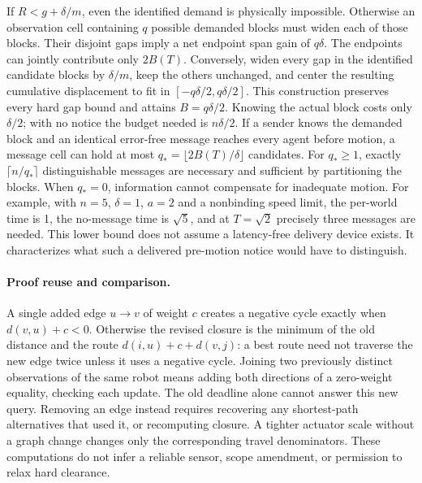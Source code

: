 \documentclass[11pt]{article}
\begin{document}
If \(R<g+\delta/m\), even the identified demand is physically
impossible. Otherwise an observation cell containing \(q\)
possible demanded blocks must widen each of those blocks. Their
disjoint gaps imply a net endpoint span gain of \(q\delta\).
The endpoints can jointly contribute only \(2B(T)\).
Conversely, widen every gap in the identified candidate blocks by
\(\delta/m\), keep the others unchanged, and center the resulting
cumulative displacement to fit in \([-q\delta/2,q\delta/2]\).
This construction preserves every hard gap bound and attains
\(B=q\delta/2\). Knowing the actual block costs only
\(\delta/2\); with no notice the budget needed is \(n\delta/2\).
If a sender knows the demanded block and an identical error-free
message reaches every agent before motion, a message cell can hold
at most \(q_*=\lfloor 2B(T)/\delta\rfloor\) candidates. For
\(q_*\ge1\), exactly \(\lceil n/q_*\rceil\) distinguishable messages
are necessary and sufficient by partitioning the blocks. When
\(q_*=0\), information cannot compensate for inadequate motion.
For example, with \(n=5\), \(\delta=1\), \(a=2\) and a nonbinding
speed limit, the per-world time is 1, the no-message time is
\(\sqrt5\), and at \(T=\sqrt2\) precisely three messages are needed.
This lower bound does not assume a latency-free delivery device
exists. It characterizes what such a delivered pre-motion notice
would have to distinguish.

\paragraph{Proof reuse and comparison.}
A single added edge \(u\to v\) of weight \(c\) creates a negative
cycle exactly when \(d(v,u)+c<0\). Otherwise the revised closure
is the minimum of the old distance and the route
\(d(i,u)+c+d(v,j)\): a best route need not traverse the new
edge twice unless it uses a negative cycle. Joining two previously
distinct observations of the same robot means adding both
directions of a zero-weight equality, checking each update.
The old deadline alone cannot answer this new query. Removing an
edge instead requires recovering any shortest-path alternatives
that used it, or recomputing closure. A tighter actuator scale
without a graph change changes only the corresponding travel
denominators. These computations do not infer a reliable sensor,
scope amendment, or permission to relax hard clearance.
\end{document}
